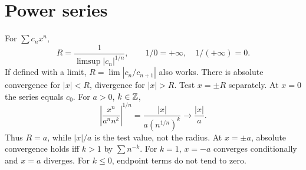 \section{Power series}
\label{sec:appendix:formula-sheet-power-series}
For $\sum c_nx^n$,
\[
  R=\frac1{\limsup|c_n|^{1/n}},\qquad
  1/0=+\infty,\quad1/(+\infty)=0.
\]
If defined with a limit, $R=\lim|c_n/c_{n+1}|$ also works.
There is absolute convergence for $|x|<R$, divergence for $|x|>R$.
Test $x=\pm R$ separately. At $x=0$ the series equals $c_0$.
For $a>0$, $k\in\mathbb{Z}$,
\[
  \left|\frac{x^n}{a^n n^k}\right|^{1/n}
     =\frac{|x|}{a(n^{1/n})^k}\longrightarrow\frac{|x|}{a}.
\]
Thus $R=a$, while $|x|/a$ is the test value, not the radius.
At $x=\pm a$, absolute convergence holds iff $k>1$ by $\sum n^{-k}$.
For $k=1$, $x=-a$ converges conditionally and $x=a$ diverges.
For $k\le0$, endpoint terms do not tend to zero.

